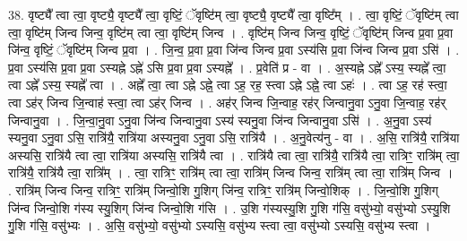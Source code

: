 \documentclass[17pt]{extarticle}
\begin{document}
38. वृष्ट्यै᳚ त्वा त्वा॒ वृष्ट्यै॒ वृष्ट्यै᳚ त्वा॒ वृष्टिं॒ ॅवृष्टि॑म् त्वा॒ वृष्ट्यै॒ वृष्ट्यै᳚ त्वा॒ वृष्टि᳚म् । . त्वा॒ वृष्टिं॒ ॅवृष्टि॑म् त्वा त्वा॒ वृष्टि॑म् जिन्व जिन्व॒ वृष्टि॑म् त्वा त्वा॒ वृष्टि॑म् जिन्व । . वृष्टि॑म् जिन्व जिन्व॒ वृष्टिं॒ ॅवृष्टि॑म् जिन्व प्र॒वा प्र॒वा जि॑न्व॒ वृष्टिं॒ ॅवृष्टि॑म् जिन्व प्र॒वा । . जि॒न्व॒ प्र॒वा प्र॒वा जि॑न्व जिन्व प्र॒वा ऽस्य॑सि प्र॒वा जि॑न्व जिन्व प्र॒वा ऽसि॑ । . प्र॒वा ऽस्य॑सि प्र॒वा प्र॒वा ऽस्यह्ने ऽह्ने॑ ऽसि प्र॒वा प्र॒वा ऽस्यह्ने᳚ । . प्र॒वेति॑ प्र - वा । . अ॒स्यह्ने ऽह्ने᳚ ऽस्य॒ स्यह्ने᳚ त्वा॒ त्वा ऽह्ने᳚ ऽस्य॒ स्यह्ने᳚ त्वा । . अह्ने᳚ त्वा॒ त्वा ऽह्ने ऽह्ने॒ त्वा ऽह॒ रह॒ स्त्वा ऽह्ने ऽह्ने॒ त्वा ऽहः॑ । . त्वा ऽह॒ रह॑ स्त्वा॒ त्वा ऽह॑र् जिन्व जि॒न्वाह॑ स्त्वा॒ त्वा ऽह॑र् जिन्व । . अह॑र् जिन्व जि॒न्वाह॒ रह॑र् जिन्वानु॒वा ऽनु॒वा जि॒न्वाह॒ रह॑र् जिन्वानु॒वा । . जि॒न्वा॒नु॒वा ऽनु॒वा जि॑न्व जिन्वानु॒वा ऽस्य॑ स्यनु॒वा जि॑न्व जिन्वानु॒वा ऽसि॑ । . अ॒नु॒वा ऽस्य॑ स्यनु॒वा ऽनु॒वा ऽसि॒ रात्रि॑यै॒ रात्रि॑या अस्यनु॒वा ऽनु॒वा ऽसि॒ रात्रि॑यै । . अ॒नु॒वेत्य॑नु - वा । . अ॒सि॒ रात्रि॑यै॒ रात्रि॑या अस्यसि॒ रात्रि॑यै त्वा त्वा॒ रात्रि॑या अस्यसि॒ रात्रि॑यै त्वा । . रात्रि॑यै त्वा त्वा॒ रात्रि॑यै॒ रात्रि॑यै त्वा॒ रात्रिꣳ॒॒ रात्रि॑म् त्वा॒ रात्रि॑यै॒ रात्रि॑यै त्वा॒ रात्रि᳚म् । . त्वा॒ रात्रिꣳ॒॒ रात्रि॑म् त्वा त्वा॒ रात्रि॑म् जिन्व जिन्व॒ रात्रि॑म् त्वा त्वा॒ रात्रि॑म् जिन्व । . रात्रि॑म् जिन्व जिन्व॒ रात्रिꣳ॒॒ रात्रि॑म् जिन्वो॒शि गु॒शिग् जि॑न्व॒ रात्रिꣳ॒॒ रात्रि॑म् जिन्वो॒शिक् । . जि॒न्वो॒शि गु॒शिग् जि॑न्व जिन्वो॒शि ग॑स्य स्यु॒शिग् जि॑न्व जिन्वो॒शि ग॑सि । . उ॒शि ग॑स्यस्यु॒शि गु॒शि ग॑सि॒ वसु॑भ्यो॒ वसु॑भ्यो ऽस्यु॒शि गु॒शि ग॑सि॒ वसु॑भ्यः । . अ॒सि॒ वसु॑भ्यो॒ वसु॑भ्यो ऽस्यसि॒ वसु॑भ्य स्त्वा त्वा॒ वसु॑भ्यो ऽस्यसि॒ वसु॑भ्य स्त्वा । \newline
\pagebreak
{}
\end{document}
